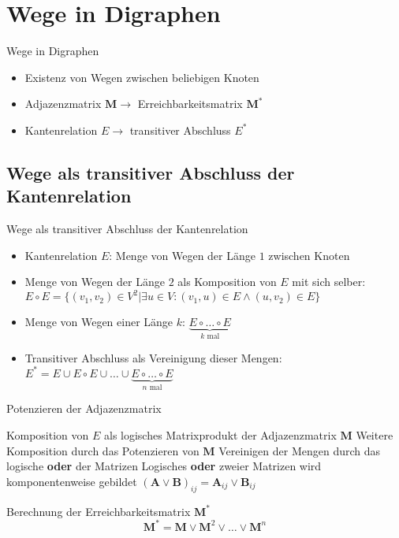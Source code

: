 \documentclass[mathserif]{beamer}
\begin{document}
\section{Wege in Digraphen}
\begin{frame}{Wege in Digraphen}
    \begin{itemize}
        \item Existenz von Wegen zwischen beliebigen Knoten
        \item Adjazenzmatrix $\mathbf{M}\longrightarrow$ Erreichbarkeitsmatrix $\mathbf{M}^*$
        \item Kantenrelation $E\longrightarrow$ transitiver Abschluss $E^*$
    \end{itemize}
\end{frame}
\subsection{Wege als transitiver Abschluss der Kantenrelation}
\begin{frame}{Wege als transitiver Abschluss der Kantenrelation}
    \begin{itemize}
        \item Kantenrelation $E$: Menge von Wegen der Länge $1$ zwischen Knoten
        \item Menge von Wegen der Länge $2$ als Komposition von $E$ mit sich selber:\\$E\circ E=\{(v_1,v_2)\in V^2|\exists u\in V:(v_1,u)\in E\land(u,v_2)\in E\}$
        \item Menge von Wegen einer Länge $k$: $\underbrace{E\circ\dots\circ E}_{k\text{ mal}}$
        \item Transitiver Abschluss als Vereinigung dieser Mengen:\\$E^*=E\cup E\circ E\cup\dots\cup\underbrace{E\circ\dots\circ E}_{n\text{ mal}}$
    \end{itemize}
\end{frame}
\begin{frame}{Potenzieren der Adjazenzmatrix}
    \begin{outline}
        \1 Komposition von $E$ als logisches Matrixprodukt der Adjazenzmatrix $\mathbf{M}$
        \1 Weitere Komposition durch das Potenzieren von $\mathbf{M}$
        \1 Vereinigen der Mengen durch das logische \textbf{oder} der Matrizen
        \1 Logisches \textbf{oder} zweier Matrizen wird komponentenweise gebildet
        \2 $(\mathbf{A}\lor\mathbf{B})_{ij}=\mathbf{A}_{ij}\lor\mathbf{B}_{ij}$
    \end{outline}
    \begin{block}{Berechnung der Erreichbarkeitsmatrix $\mathbf{M}^*$}
        \[\mathbf{M}^*=\mathbf{M}\lor\mathbf{M}^2\lor\dots\lor\mathbf{M}^n\]
    \end{block}
\end{frame}
\end{document}
